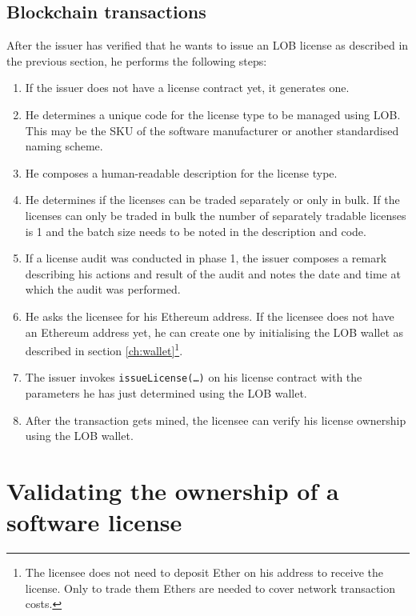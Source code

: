 \documentclass[a4paper]{article}
\begin{document}
\subsection{Blockchain transactions}

After the issuer has verified that he wants to issue an LOB license as described in the previous section, he performs the following steps:

\begin{enumerate}
  \item If the issuer does not have a license contract yet, it generates one.
  \item He determines a unique code for the license type to be managed using LOB. This may be the SKU of the software manufacturer or another standardised naming scheme.
  \item He composes a human-readable description for the license type.
  \item He determines if the licenses can be traded separately or only in bulk. If the licenses can only be traded in bulk the number of separately tradable licenses is 1 and the batch size needs to be noted in the description and code.
  \item If a license audit was conducted in phase 1, the issuer composes a remark describing his actions and result of the audit and notes the date and time at which the audit was performed.
  \item He asks the licensee for his Ethereum address. If the licensee does not have an Ethereum address yet, he can create one by initialising the LOB wallet as described in section \ref{ch:wallet}\footnote{The licensee does not need to deposit Ether on his address to receive the license. Only to trade them Ethers are needed to cover network transaction costs.}.
  \item The issuer invokes \texttt{issueLicense(…)} on his license contract with the parameters he has just determined using the LOB wallet.
  \item After the transaction gets mined, the licensee can verify his license ownership using the LOB wallet.
\end{enumerate}





\section{Validating the ownership of a software license}
\label{ch:validatingOwnership}
\end{document}
